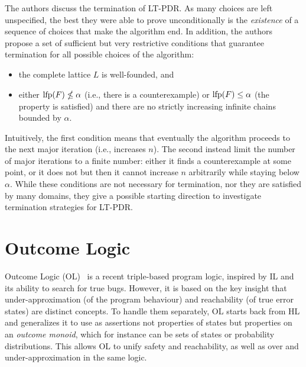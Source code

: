 The authors discuss the termination of LT-PDR. As many choices are left unspecified, the best they were able to prove unconditionally is the \emph{existence} of a sequence of choices that make the algorithm end. In addition, the authors propose a set of sufficient but very restrictive conditions that guarantee termination for all possible choices of the algorithm:
\begin{itemize}
	\item the complete lattice $L$ is well-founded, and
	\item either $\text{lfp}(F) \nleq \alpha$ (i.e., there is a counterexample) or $\text{lfp}(F) \le \alpha$ (the property is satisfied) and there are no strictly increasing infinite chains bounded by $\alpha$.
\end{itemize}
Intuitively, the first condition means that eventually the algorithm proceeds to the next major iteration (i.e., increases $n$). The second instead limit the number of major iterations to a finite number: either it finds a counterexample at some point, or it does not but then it cannot increase $n$ arbitrarily while staying below $\alpha$. While these conditions are not necessary for termination, nor they are satisfied by many domains, they give a possible starting direction to investigate termination strategies for LT-PDR.

\section{Outcome Logic}\label{sec:sota:ol}
Outcome Logic (OL)~\cite{ZDS23} is a recent triple-based program logic, inspired by IL and its ability to search for true bugs. However, it is based on the key insight that under-approximation (of the program behaviour) and reachability (of true error states) are distinct concepts. To handle them separately, OL starts back from HL and generalizes it to use as assertions not properties of states but properties on an \emph{outcome monoid}, which for instance can be sets of states or probability distributions. This allows OL to unify safety and reachability, as well as over and under-approximation in the same logic.

